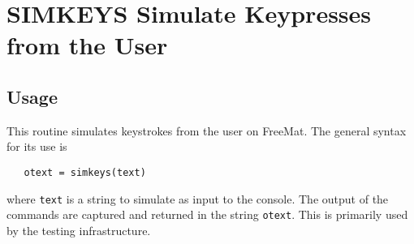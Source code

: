 \section{SIMKEYS Simulate Keypresses from the User}

\subsection{Usage}

This routine simulates keystrokes from the user on FreeMat.
The general syntax for its use is
\begin{verbatim}
   otext = simkeys(text)
\end{verbatim}
where \verb|text| is a string to simulate as input to the console.
The output of the commands are captured and returned in the 
string \verb|otext|.  This is primarily used by the testing 
infrastructure.
